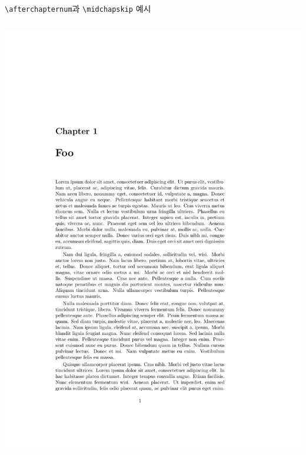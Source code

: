 \documentclass{beamer}
\def\tbs{\textbackslash}
\begin{document}
\begin{frame}[fragile]
  {\texttt{\tbs afterchapternum}과 \texttt{\tbs midchapskip} 예시}
  \begin{overprint}
    \begin{columns}
      \begin{column}{0.5\textwidth}
        \begin{latexcode}
          \setlength\midchapskip{20pt}
        \end{latexcode}
        \begin{center}
          \includegraphics[frame,page=1,width=0.8\linewidth]{afterchapternum}
        \end{center}
      \end{column}


\end{columns}
\end{overprint}
\end{frame}
\end{document}
